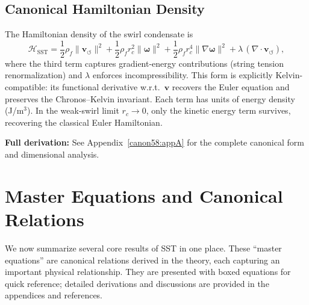 \documentclass[10pt,reprint,aps,onecolumn,nofootinbib]{revtex4-2}
\begin{document}

    \subsection{Canonical Hamiltonian Density}
    \label{subsec:hamiltonian-density}

    The Hamiltonian density of the swirl condensate is
    \[
        \mathcal{H}_{\mathrm{SST}} =
        \frac{1}{2} \rho_{\!f} \lVert \mathbf{v}_{\!\boldsymbol{\circlearrowleft}}\rVert^2
        + \frac{1}{2} \rho_{\!f} r_c^{2} \lVert \boldsymbol{\omega} \rVert^{2}
        + \frac{1}{2} \rho_{\!f} r_c^{4} \lVert \nabla \boldsymbol{\omega} \rVert^{2}
        + \lambda\,(\nabla \cdot \mathbf{v}_{\!\boldsymbol{\circlearrowleft}}),
    \]
    where the third term captures gradient-energy contributions (string tension renormalization)
    and $\lambda$ enforces incompressibility. This form is explicitly Kelvin-compatible:
    its functional derivative w.r.t.\ $\mathbf{v}$ recovers the Euler equation and preserves
    the Chronos--Kelvin invariant. Each term has units of energy density (J/m$^3$). In the weak-swirl limit $r_c \to 0$,
    only the kinetic energy term survives, recovering the classical Euler Hamiltonian.

    \textbf{Full derivation:} See Appendix~\ref{canon58:appA} for the complete canonical form and dimensional analysis.

    \section{Master Equations and Canonical Relations}
        We now summarize several core results of SST in one place. These “master equations” are canonical relations derived in the theory, each capturing an important physical relationship. They are presented with boxed equations for quick reference; detailed derivations and discussions are provided in the appendices and references.
\end{document}
